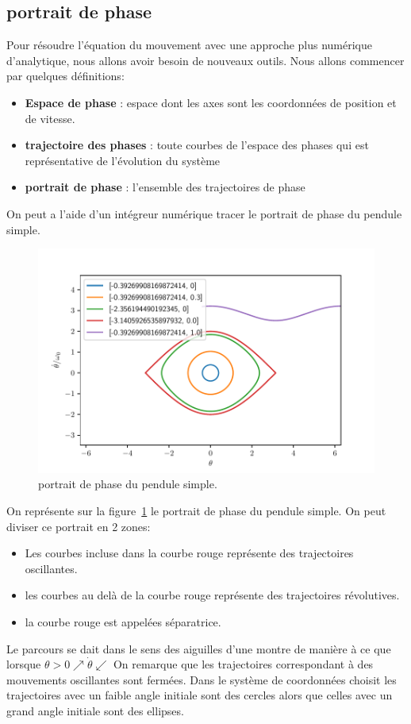 \documentclass{article}
\begin{document}
\subsection{portrait de phase}
Pour résoudre l'équation du mouvement avec une approche plus numérique d'analytique, nous allons avoir besoin de nouveaux outils. 
Nous allons commencer par quelques définitions:
\begin{itemize}
    \item \textbf{Espace de phase} : espace dont les axes sont les coordonnées de position et de vitesse.
    \item \textbf{trajectoire des phases} : toute courbes de l'espace des phases qui est représentative de l'évolution du système
    \item \textbf{portrait de phase} : l'ensemble des trajectoires de phase
\end{itemize}
On peut a l'aide d'un intégreur numérique tracer le portrait de phase du pendule simple. 
\begin{figure}[htbp]
    \centering
    \includegraphics[width=0.9\linewidth]{portrait_phase_pend_simple}
    \caption{portrait de phase du pendule simple.}
    \label{fig:portrait_phase_pend_simple}
\end{figure}
On représente sur la figure~\ref{fig:portrait_phase_pend_simple} le portrait de phase du pendule simple. On peut diviser ce portrait en 2 zones:
\begin{itemize}
    \item Les courbes incluse dans la courbe rouge représente des trajectoires oscillantes. 
    \item les courbes au delà de la courbe rouge représente des trajectoires révolutives. 
    \item la courbe rouge est appelées séparatrice.
\end{itemize}
Le parcours se dait dans le sens des aiguilles d'une montre de manière à ce que lorsque $\theta>0\nearrow\dot\theta \swarrow $ 
On remarque que les trajectoires correspondant à des mouvements oscillantes sont fermées. Dans le système de coordonnées choisit les trajectoires avec un faible angle initiale sont des cercles alors que celles avec un grand angle initiale sont des ellipses. \\
\end{document}
